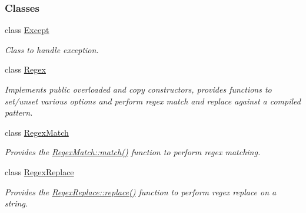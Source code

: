 \subsubsection*{Classes}
\begin{DoxyCompactItemize}
\item 
class \hyperlink{classjpcre2_1_1Except}{Except}
\begin{DoxyCompactList}\small\item\em Class to handle exception. \end{DoxyCompactList}\item 
class \hyperlink{classjpcre2_1_1Regex}{Regex}
\begin{DoxyCompactList}\small\item\em Implements public overloaded and copy constructors, provides functions to set/unset various options and perform regex match and replace against a compiled pattern. \end{DoxyCompactList}\item 
class \hyperlink{classjpcre2_1_1RegexMatch}{Regex\+Match}
\begin{DoxyCompactList}\small\item\em Provides the \hyperlink{classjpcre2_1_1RegexMatch_a5868aef3a146594ea1ebef34d122bb33}{Regex\+Match\+::match()} function to perform regex matching. \end{DoxyCompactList}\item 
class \hyperlink{classjpcre2_1_1RegexReplace}{Regex\+Replace}
\begin{DoxyCompactList}\small\item\em Provides the \hyperlink{classjpcre2_1_1RegexReplace_afd087fa7a9bfedec802d1a3dd7edbdd0}{Regex\+Replace\+::replace()} function to perform regex replace on a string. \end{DoxyCompactList}\end{DoxyCompactItemize}
